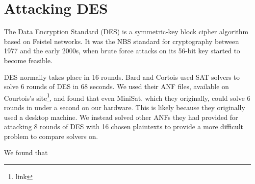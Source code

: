 \section{Attacking DES}
The Data Encryption Standard (DES) is a symmetric-key block cipher algorithm based on Feistel networks. It was the NBS standard for cryptography between 1977 and the early 2000s, when brute force attacks on its 56-bit key started to become feasible.\cite{find appropriate citation}

DES normally takes place in 16 rounds. Bard and Cortois\cite{citation} used SAT solvers to solve 6 rounds of DES in 68 seconds. We used their ANF files, available on Courtois's site\footnote{link}, and found that even MiniSat, which they originally, could solve 6 rounds in under a second on our hardware. This is likely because they originally used a desktop machine. We instead solved other ANFs they had provided for attacking 8 rounds of DES with 16 chosen plaintexts to provide a more difficult problem to compare solvers on.

We found that 

%		
%	
